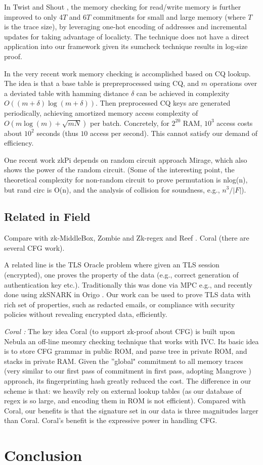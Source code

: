	In Twist and Shout \cite{TwistShout}, the memory checking for
read/write memory is further improved to only 4$T$ and 6$T$ 
commitments for small and large memory (where $T$ is the trace size),
by leveraging one-hot encoding of addresses and incremental updates
for taking advantage of localicty. The technique does not have a
direct application into our framework given its sumcheck technique
results in log-size proof.

	In the very recent work \cite{RAMLookup} memory checking is
accomplished based on CQ lookup. The idea is that a base table
is prepreprocessed using CQ, and $m$ operations over a deviated
table with hamming distance $\delta$ can be achieved in
complexity $O((m+\delta)\log(m+\delta))$. Then preprocessed CQ keys
are generated periodically, achieving amortized memory access
complexity of $O(m\log(m) + \sqrt{mN})$ per batch. Concretely,
for $2^{20}$ RAM, $10^3$ access costs about $10^2$ seconds (thus
$10$ access per second).  This cannot satisfy our demand of efficiency.

   One recent work zkPi \cite{zkPi} depends on random circuit 
   approach Mirage\cite{Mirage}, which also shows the power of
   the random circuit. (Some of the interesting point, the theoretical
   complexity for non-random circuit to prove permutation is nlog(n),
   but rand circ is O(n), and the analysis of collision for soundness, e.g.,
   $n^3/|F|$).

\subsection{Related in Field}
Compare with zk-MiddleBox, Zombie \cite{Zombie23} and Zk-regex \cite{Luo23}
and Reef \cite{Reef}. Coral \cite{Coral} (there are several CFG work).

A related line is the TLS Oracle problem where given an TLS session (encrypted), one proves the property of the data (e.g., correct generation of
 authentication key etc.). Traditionally this was done via MPC
 e.g., \cite{Deco,Xie24,Janus} and recently done using zkSNARK in
  Origo \cite{Origo}. Our work can be used to prove TLS data
  with rich set of properties, such as redacted emails, or compliance with
  security policies without revealing encrypted data, efficiently.

{\em Coral \cite{Coral}:} The key idea Coral (to support zk-proof
about CFG) is built upon Nebula \cite{Nebula} an off-line meomry checking
technique that works with IVC. Its basic idea is to store
 CFG grammar in public ROM, and parse tree in private ROM, and 
 stacks in private RAM. Given the ''global" commitment to all memory
 traces (very similar to our first pass of commitment in first pass,
 adopting Mangrove \cite{Mangrove}) approach, its fingerprinting hash
 greatly reduced the cost. The difference in our scheme is that:
 we heavily rely on external lookup tables (as our database of
 regex is so large, and encoding them in ROM is not efficient).
 Compared with Coral, our benefits is that the signature set in
 our data is three magnitudes larger than Coral. Coral's benefit
 is the expressive power in handling CFG.
\section{Conclusion}
